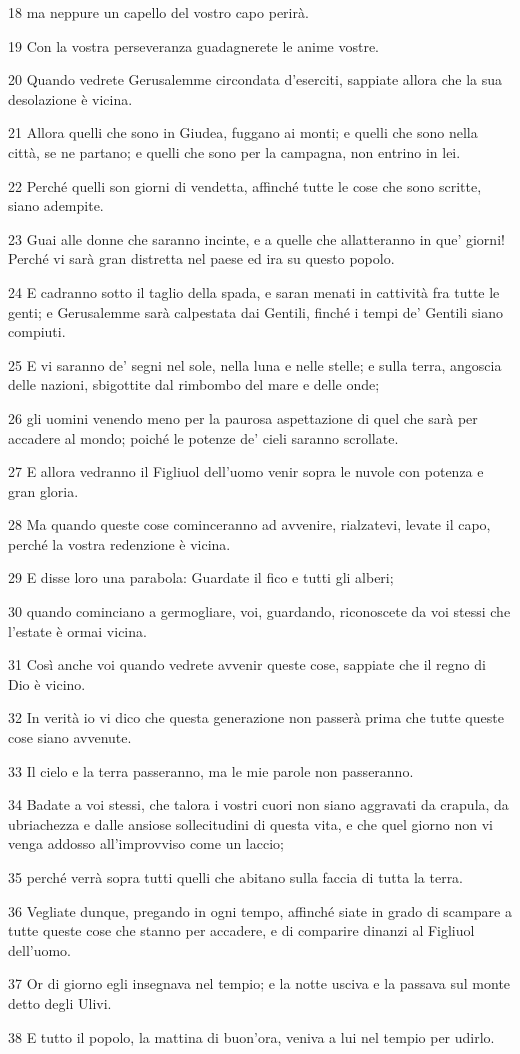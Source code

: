 \par 18 ma neppure un capello del vostro capo perirà.
\par 19 Con la vostra perseveranza guadagnerete le anime vostre.
\par 20 Quando vedrete Gerusalemme circondata d'eserciti, sappiate allora che la sua desolazione è vicina.
\par 21 Allora quelli che sono in Giudea, fuggano ai monti; e quelli che sono nella città, se ne partano; e quelli che sono per la campagna, non entrino in lei.
\par 22 Perché quelli son giorni di vendetta, affinché tutte le cose che sono scritte, siano adempite.
\par 23 Guai alle donne che saranno incinte, e a quelle che allatteranno in que' giorni! Perché vi sarà gran distretta nel paese ed ira su questo popolo.
\par 24 E cadranno sotto il taglio della spada, e saran menati in cattività fra tutte le genti; e Gerusalemme sarà calpestata dai Gentili, finché i tempi de' Gentili siano compiuti.
\par 25 E vi saranno de' segni nel sole, nella luna e nelle stelle; e sulla terra, angoscia delle nazioni, sbigottite dal rimbombo del mare e delle onde;
\par 26 gli uomini venendo meno per la paurosa aspettazione di quel che sarà per accadere al mondo; poiché le potenze de' cieli saranno scrollate.
\par 27 E allora vedranno il Figliuol dell'uomo venir sopra le nuvole con potenza e gran gloria.
\par 28 Ma quando queste cose cominceranno ad avvenire, rialzatevi, levate il capo, perché la vostra redenzione è vicina.
\par 29 E disse loro una parabola: Guardate il fico e tutti gli alberi;
\par 30 quando cominciano a germogliare, voi, guardando, riconoscete da voi stessi che l'estate è ormai vicina.
\par 31 Così anche voi quando vedrete avvenir queste cose, sappiate che il regno di Dio è vicino.
\par 32 In verità io vi dico che questa generazione non passerà prima che tutte queste cose siano avvenute.
\par 33 Il cielo e la terra passeranno, ma le mie parole non passeranno.
\par 34 Badate a voi stessi, che talora i vostri cuori non siano aggravati da crapula, da ubriachezza e dalle ansiose sollecitudini di questa vita, e che quel giorno non vi venga addosso all'improvviso come un laccio;
\par 35 perché verrà sopra tutti quelli che abitano sulla faccia di tutta la terra.
\par 36 Vegliate dunque, pregando in ogni tempo, affinché siate in grado di scampare a tutte queste cose che stanno per accadere, e di comparire dinanzi al Figliuol dell'uomo.
\par 37 Or di giorno egli insegnava nel tempio; e la notte usciva e la passava sul monte detto degli Ulivi.
\par 38 E tutto il popolo, la mattina di buon'ora, veniva a lui nel tempio per udirlo.

